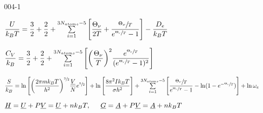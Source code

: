 \begin{mitframe}{004-1}
\begin{listone}
    
    \item $\dfrac{\intenergy}{\boltz\Temp}=\dfrac{3}{2}+\dfrac{2}{2}+\sum\limits_{i=1}^{3\nummoles_{atoms}-5}\Bigg[\dfrac{\vibrfreqfac}{2\Temp}+\dfrac{\sfrac{\vibrfreqfac}{\Temp}}{e^{\sfrac{\vibrfreqfac}{\Temp}}-1}\Bigg]-\dfrac{\eneatom}{\boltz\Temp}$
    
    
    \item $\dfrac{\cv}{\boltz}=\dfrac{3}{2}+\dfrac{2}{2}+\sum\limits_{i=1}^{3\nummoles_{atoms}-5}\Bigg[\bigg(\dfrac{\vibrfreqfac}{\Temp}\bigg)^{2}\dfrac{e^{\sfrac{\vibrfreqfac}{\Temp}}}{(e^{\sfrac{\vibrfreqfac}{\Temp}}-1)^{2}}\Bigg]$
           
    
    \item $\dfrac{\entropy}{\boltz}=\ln\Bigg[\bigg(\dfrac{2\pie\mass\boltz\Temp}{\planck^{2}}\bigg)^{\sfrac{3}{2}}\dfrac{\uline{\vol}}{\nummoles}e^{\sfrac{5}{2}}\Bigg]+\ln\Bigg[\dfrac{8\pie^{2}\mominertia\boltz\Temp}{\molecrad\planck^{2}}\Bigg]+\sum\limits_{i=1}^{3\nummoles_{atoms}-5}\Bigg[\dfrac{\sfrac{\vibrfreqfac}{\Temp}}{e^{\sfrac{\vibrfreqfac}{\Temp}}-1}-\ln(1-e^{-\sfrac{\vibrfreqfac}{\Temp}})\Bigg]+\ln\elecdegen$          
            
    \item $\uline{\enthalpy}=\uline{\intenergy}+\p\uline{\vol}=\uline{\intenergy}+n\boltz\Temp,\tab \uline{\gibbs}=\uline{\helmholtz}+\p\uline{\vol}=\uline{\helmholtz}+n\boltz\Temp$
    
            

\end{listone}
\end{mitframe}
